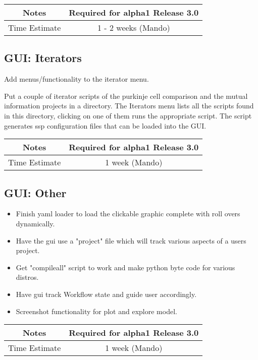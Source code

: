 \documentclass[12pt]{article}
\begin{document}
{
  \vspace{5mm}
  \centering
  \begin{tabular}{|c|c|}
    \hline
    Notes
    & Required for alpha1 Release 3.0 \\
    \hline
    Time Estimate
    & 1 - 2 weeks (Mando) \\
    \hline
  \end{tabular}
}


\subsection{GUI: Iterators}
Add menus/functionality to the iterator menu.

Put a couple of iterator scripts of the purkinje cell comparison and
the mutual information projects in a directory.  The Iterators menu
lists all the scripts found in this directory, clicking on one of them
runs the appropriate script.  The script generates ssp configuration
files that can be loaded into the GUI.

{
  \vspace{5mm}
  \centering
  \begin{tabular}{|c|c|}
    \hline
    Notes
    & Required for alpha1 Release 3.0 \\
    \hline
    Time Estimate
    & 1 week (Mando) \\
    \hline
  \end{tabular}
}


\subsection{GUI: Other}
\begin{itemize}
\item Finish yaml loader to load the clickable graphic complete with
  roll overs dynamically.
\item Have the gui use a "project" file which will track various
  aspects of a users project.
\item Get "compileall" script to work and make python byte code for
  various distros.
\item Have gui track Workflow state and guide user accordingly.
\item Screenshot functionality for plot and explore model.
\end{itemize}

{
  \vspace{5mm}
  \centering
  \begin{tabular}{|c|c|}
    \hline
    Notes
    & Required for alpha1 Release 3.0 \\
    \hline
    Time Estimate
    & 1 week (Mando)\\
    \hline
  \end{tabular}
}
\end{document}
